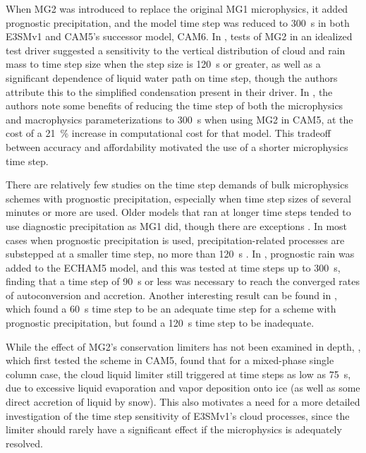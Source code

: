 \documentclass [11pt, proquest] {uwthesis}[2020/02/24]
\begin{document}
When MG2 was introduced to replace the original MG1 microphysics, it added prognostic precipitation, and the model time step was reduced to \SI{300}{\second} in both E3SMv1 and CAM5’s successor model, CAM6. In \textcite{Gettelman2015-pI}, tests of MG2 in an idealized test driver suggested a sensitivity to the vertical distribution of cloud and rain mass to time step size when the step size is \SI{120}{\second} or greater, as well as a significant dependence of liquid water path on time step, though the authors attribute this to the simplified condensation present in their driver. In \textcite{Gettelman2015-pII}, the authors note some benefits of reducing the time step of both the microphysics and macrophysics parameterizations to \SI{300}{\second} when using MG2 in CAM5, at the cost of a \SI{21}{\percent} increase in computational cost for that model. This tradeoff between accuracy and affordability motivated the use of a shorter microphysics time step.

There are relatively few studies on the time step demands of bulk microphysics schemes with prognostic precipitation, especially when time step sizes of several minutes or more are used. Older models that ran at longer time steps tended to use diagnostic precipitation as MG1 did, though there are exceptions \parencite{Lopez2002}. In most cases when prognostic precipitation is used, precipitation-related processes are substepped at a smaller time step, no more than \SI{120}{\second} \parencite{Fowler1996,Sant2015,Michibata2019}. In \textcite{Posselt2008}, prognostic rain was added to the ECHAM5 model, and this was tested at time steps up to \SI{300}{\second}, finding that a time step of \SI{90}{\second} or less was necessary to reach the converged rates of autoconversion and accretion. Another interesting result can be found in \textcite{Chosson2014}, which found a \SI{60}{\second} time step to be an adequate time step for a scheme with prognostic precipitation, but found a \SI{120}{\second} time step to be inadequate.

While the effect of MG2's conservation limiters has not been examined in depth, \textcite{Gettelman2015-pII}, which first tested the scheme in CAM5, found that for a mixed-phase single column case, the cloud liquid limiter still triggered at time steps as low as \SI{75}{\second}, due to excessive liquid evaporation and vapor deposition onto ice (as well as some direct accretion of liquid by snow). This also motivates a need for a more detailed investigation of the time step sensitivity of E3SMv1's cloud processes, since the limiter should rarely have a significant effect if the microphysics is adequately resolved.
\end{document}
